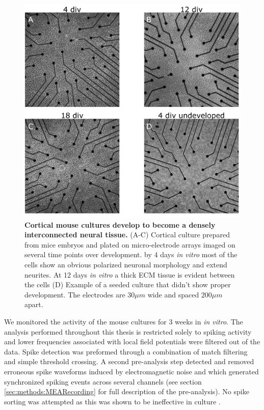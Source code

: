        \begin{figure}[!htb]
            \centering
            \includegraphics[width=15cm]{chapter3/figures/mouseImages/mouseImages.jpg}

            \caption[Representative images of a cortical mouse culture developing on a planar multi electrode array]{\textbf{Cortical mouse cultures develop to become a densely interconnected neural tissue.} (A-C) Cortical culture prepared from mice embryos and plated on micro-electrode arrays imaged on several time points over development. by 4 days \textit{in vitro} most of the cells show an obvious polarized neuronal morphology and extend neurites. At 12 days \textit{in vitro} a thick ECM tissue is evident between the cells (D) Example of a seeded culture that didn't show proper development. The electrodes are \(30 \mu m\) wide and spaced \(200 \mu m\) apart.}
            \label{fig:activity:mouseImages}
        \end{figure}




    We monitored the activity of the mouse cultures for 3 weeks in \textit{in vitro}. The analysis performed throughout this thesis is restricted solely to spiking activity and lower frequencies associated with local field potentials were filtered out of the data. Spike detection was preformed through a combination of match filtering and simple threshold crossing. A second pre-analysis step detected and removed erroneous spike waveforms induced by electromagnetic noise and which generated synchronized spiking events across several channels (see section \ref{sec:methods:MEARecording} for full description of the pre-analysis). No spike sorting was attempted as this was shown to be ineffective in culture \cite{herzog2011optical}.

